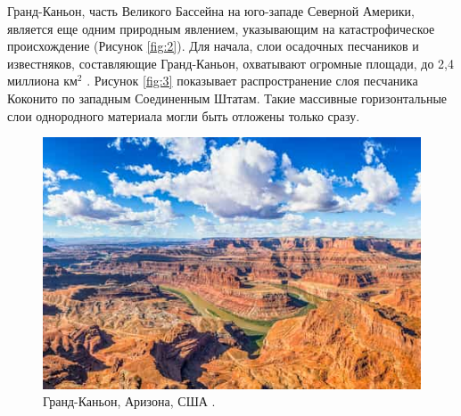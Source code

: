 \documentclass[10pt,twocolumn,letterpaper]{article}
\begin{document}
Гранд-Каньон, часть Великого Бассейна на юго-западе Северной Америки, является еще одним природным явлением, указывающим на катастрофическое происхождение (Рисунок \ref{fig:2}). Для начала, слои осадочных песчаников и известняков, составляющие Гранд-Каньон, охватывают огромные площади, до 2,4 миллиона км$^2$ \cite{21}. Рисунок \ref{fig:3} показывает распространение слоя песчаника Коконито по западным Соединенным Штатам. Такие массивные горизонтальные слои однородного материала могли быть отложены только сразу.

\begin{figure}[t]
\begin{center}
   \includegraphics[width=1\linewidth]{grand-canyon.jpg}
\end{center}
   \caption{Гранд-Каньон, Аризона, США \cite{49}.}
\label{fig:2}
\label{fig:onecol}
\end{figure}
\end{document}
